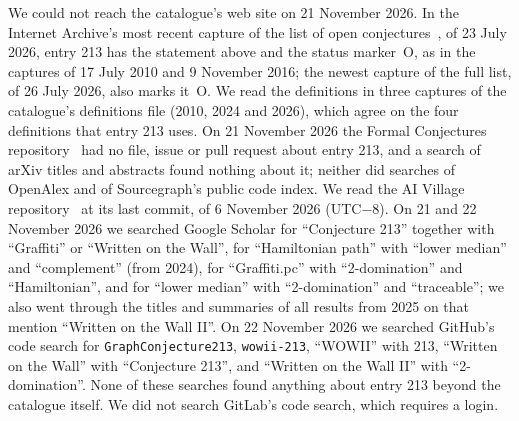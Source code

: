 \documentclass[11pt,a4paper]{article}
\theoremstyle{remark}
\begin{document}
We could not reach the catalogue's web site on 21 November 2026. In the Internet Archive's most
recent capture of the list of open conjectures~\cite{wowii}, of 23 July 2026, entry 213 has the
statement above and the status marker~O, as in the captures of 17 July 2010 and 9 November 2016;
the newest capture of the full list, of 26 July 2026, also marks it~O. We read the
definitions in three captures of the catalogue's definitions file (2010, 2024 and 2026), which
agree on the four definitions that entry 213 uses. On 21 November 2026 the Formal Conjectures repository~\cite{fc} had no file, issue or pull
request about entry 213, and a search of arXiv titles and abstracts found nothing about it; neither
did searches of OpenAlex and of Sourcegraph's public code index. We read
the AI Village repository~\cite{aiv} at its last commit, of 6 November 2026 (UTC$-$8). On 21 and
22 November 2026 we searched Google Scholar for ``Conjecture 213'' together with ``Graffiti'' or
``Written on the Wall'', for ``Hamiltonian path'' with ``lower median'' and ``complement'' (from
2024), for ``Graffiti.pc'' with ``2-domination'' and ``Hamiltonian'', and for ``lower median'' with
``2-domination'' and ``traceable''; we also went through the titles and summaries of all results
from 2025 on that mention ``Written on the Wall II''. On 22 November 2026 we searched GitHub's code search for \texttt{GraphConjecture213},
\texttt{wowii-213}, ``WOWII'' with 213, ``Written on the Wall'' with ``Conjecture 213'', and
``Written on the Wall II'' with ``2-domination''. None of these searches found anything about entry
213 beyond the catalogue itself. We did not search GitLab's code search, which requires a login.
\end{document}
